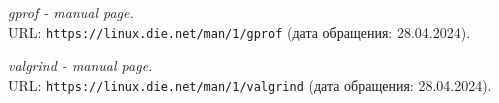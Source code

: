 \begin{thebibliography}{99}
    {\itshape gprof - manual page.} \\URL: \texttt{https://linux.die.net/man/1/gprof} (дата обращения: 28.04.2024).
    
    {\itshape valgrind - manual page.} \\URL: \texttt{https://linux.die.net/man/1/valgrind} (дата обращения: 28.04.2024).
\end{thebibliography}
\pagebreak
    
    
    